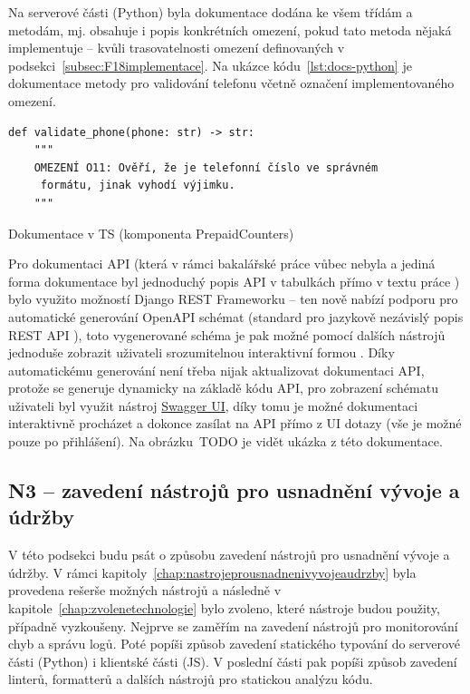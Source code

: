 Na serverové části (Python) byla dokumentace dodána ke všem třídám a metodám, mj. obsahuje i popis konkrétních omezení, pokud tato metoda nějaká implementuje -- kvůli trasovatelnosti omezení definovaných v podsekci~\ref{subsec:F18implementace}. Na ukázce kódu~\ref{lst:docs-python} je dokumentace metody pro validování telefonu včetně označení implementovaného omezení.

\begin{listing}[ht]
	\begin{verbatim}
def validate_phone(phone: str) -> str:
    """
    OMEZENÍ O11: Ověří, že je telefonní číslo ve správném
     formátu, jinak vyhodí výjimku.
    """
	\end{verbatim}
	\caption{Dokumentace v TS (komponenta PrepaidCounters)}\label{lst:docs-python}
\end{listing}

Pro dokumentaci API (která v rámci bakalářské práce vůbec nebyla a jediná forma dokumentace byl jednoduchý popis API v tabulkách přímo v textu práce \cite{bp}) bylo využito možností Django REST Frameworku -- ten nově nabízí podporu pro automatické generování OpenAPI schémat (standard pro jazykově nezávislý popis REST API \cite{openapi}), toto vygenerované schéma je pak možné pomocí dalších nástrojů jednoduše zobrazit uživateli srozumitelnou interaktivní formou \cite{drf-openapi}. Díky automatickému generování není třeba nijak aktualizovat dokumentaci API, protože se generuje dynamicky na základě kódu API, pro zobrazení schématu uživateli byl využit nástroj \href{https://swagger.io/tools/swagger-ui/}{Swagger UI}, díky tomu je možné dokumentaci interaktivně procházet a dokonce zasílat na API přímo z UI dotazy (vše je možné pouze po přihlášení). Na obrázku~TODO je vidět ukázka z této dokumentace.

\subsection{N3 -- zavedení nástrojů pro usnadnění vývoje a údržby}\label{subsec:N3implementace}

V této podsekci budu psát o způsobu zavedení nástrojů pro usnadnění vývoje a údržby. V rámci kapitoly~\ref{chap:nastrojeprousnadnenivyvojeaudrzby} byla provedena rešerše možných nástrojů a následně v kapitole~\ref{chap:zvolenetechnologie} bylo zvoleno, které nástroje budou použity, případně vyzkoušeny. Nejprve se zaměřím na zavedení nástrojů pro monitorování chyb a správu logů. Poté popíši způsob zavedení statického typování do serverové části (Python) i klientské části (JS). V poslední části pak popíši způsob zavedení linterů, formatterů a dalších nástrojů pro statickou analýzu kódu.

